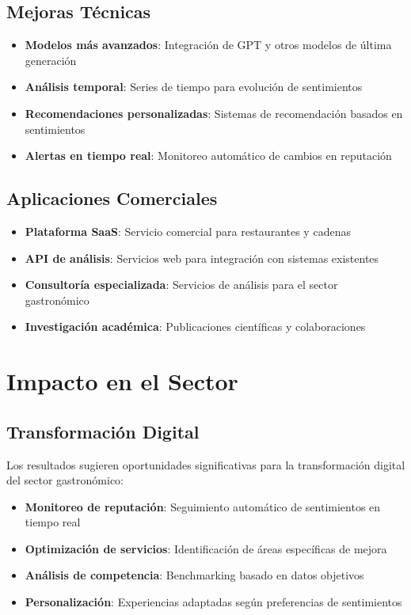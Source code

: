 \documentclass[12pt,a4paper,twoside,openany]{book}
\begin{document}
\subsection{Mejoras Técnicas}

\begin{itemize}
    \item \textbf{Modelos más avanzados}: Integración de GPT y otros modelos de última generación
    \item \textbf{Análisis temporal}: Series de tiempo para evolución de sentimientos
    \item \textbf{Recomendaciones personalizadas}: Sistemas de recomendación basados en sentimientos
    \item \textbf{Alertas en tiempo real}: Monitoreo automático de cambios en reputación
\end{itemize}

\subsection{Aplicaciones Comerciales}

\begin{itemize}
    \item \textbf{Plataforma SaaS}: Servicio comercial para restaurantes y cadenas
    \item \textbf{API de análisis}: Servicios web para integración con sistemas existentes
    \item \textbf{Consultoría especializada}: Servicios de análisis para el sector gastronómico
    \item \textbf{Investigación académica}: Publicaciones científicas y colaboraciones
\end{itemize}

\section{Impacto en el Sector}

\subsection{Transformación Digital}

Los resultados sugieren oportunidades significativas para la transformación digital del sector gastronómico:

\begin{itemize}
    \item \textbf{Monitoreo de reputación}: Seguimiento automático de sentimientos en tiempo real
    \item \textbf{Optimización de servicios}: Identificación de áreas específicas de mejora
    \item \textbf{Análisis de competencia}: Benchmarking basado en datos objetivos
    \item \textbf{Personalización}: Experiencias adaptadas según preferencias de sentimientos
\end{itemize}
\end{document}
